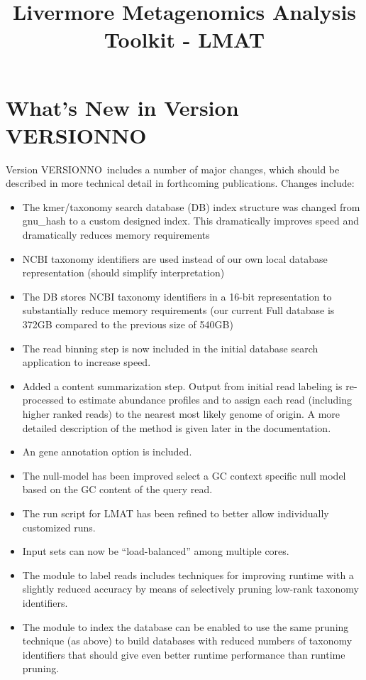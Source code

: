 \documentclass[11pt]{article}
\title{Livermore Metagenomics Analysis Toolkit - LMAT}
\newcommand{\lmatver}{VERSIONNO}
\begin{document}
\maketitle
\tableofcontents

\section{What's New in Version \lmatver}

Version \lmatver~includes a number of major changes, which should be described in more technical detail in forthcoming publications.  Changes include:
\begin{itemize}
\item The kmer/taxonomy search database (DB) index structure was changed from gnu\_hash to a custom designed index.
This dramatically improves speed and dramatically reduces memory requirements
\item NCBI taxonomy identifiers are used instead of our own local database representation (should simplify interpretation)
\item The DB stores NCBI taxonomy identifiers in a 16-bit representation to substantially reduce memory requirements
(our current Full database is 372GB compared to the previous size of 540GB)
\item The read binning step is now included in the initial database search application to increase speed.
\item Added a content summarization step.  Output from initial read labeling is re-processed to estimate abundance profiles
and to assign each read (including higher ranked reads) to the nearest most likely genome of origin. A more detailed description
of the method is given later in the documentation.
\item An gene annotation option is included.
\item The null-model has been improved select a GC context specific null model based on the GC content of the query read.
\item The run script for LMAT has been refined to better allow individually customized runs.
\item Input sets can now be ``load-balanced'' among multiple cores. 
\item The module to label reads includes techniques for improving runtime with a slightly reduced accuracy by means of selectively pruning low-rank taxonomy identifiers.  
\item The module to index the database can be enabled to use the same pruning technique (as above) to build databases with reduced numbers of taxonomy identifiers that should give even better runtime performance than runtime pruning.

\end{itemize}
\end{document}
